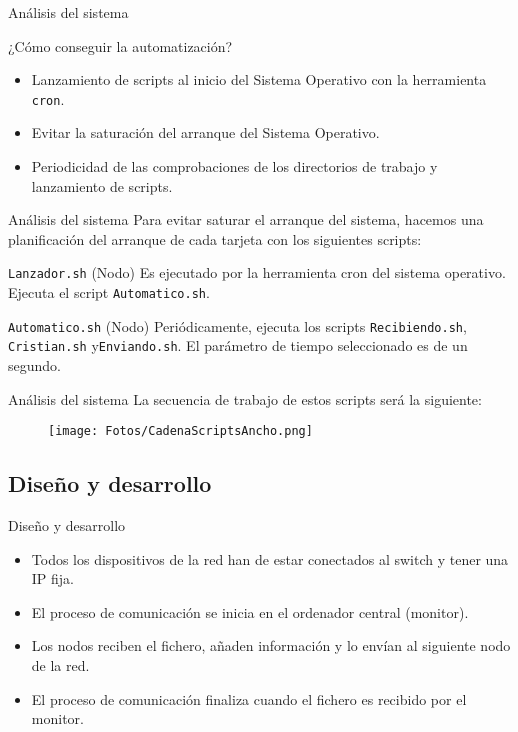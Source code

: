 \documentclass[aspectratio=169]{beamer}
\begin{document}
\begin{frame}{Análisis del sistema}
	\begin{block}{¿Cómo conseguir la automatización?}
		\begin{itemize}
			\item Lanzamiento de scripts al inicio del Sistema Operativo con la herramienta \texttt{cron}.
			\item Evitar la saturación del arranque del Sistema Operativo.
			\item Periodicidad de las comprobaciones de los directorios de trabajo y lanzamiento de scripts.
		\end{itemize}
	\end{block}
\end{frame}

\begin{frame}{Análisis del sistema}
Para evitar saturar el arranque del sistema, hacemos una planificación del arranque de cada tarjeta con los siguientes scripts:
	\begin{block}{\texttt{Lanzador.sh} (Nodo)}
		Es ejecutado por la herramienta cron del sistema operativo.
		Ejecuta el script \texttt{Automatico.sh}.
	\end{block}
	\begin{block}{\texttt{Automatico.sh} (Nodo)}
		Periódicamente, ejecuta los scripts \texttt{Recibiendo.sh}, \texttt{Cristian.sh} y\texttt{Enviando.sh}.
		El parámetro de tiempo seleccionado es de un segundo. %
	\end{block}
\end{frame}

\begin{frame}{Análisis del sistema}
	La secuencia de trabajo de estos scripts será la siguiente:
	\begin{figure}[h]
		\centering
		\texttt{[image: Fotos/CadenaScriptsAncho.png]}
	\end{figure}
\end{frame}

\subsection{Diseño y desarrollo}
\begin{frame}{Diseño y desarrollo}
\begin{itemize}
	\item Todos los dispositivos de la red han de estar conectados al switch y tener una IP fija.
	\item El proceso de comunicación se inicia en el ordenador central (monitor).
	\item Los nodos reciben el fichero, añaden información y lo envían al siguiente nodo de la red.
	\item El proceso de comunicación finaliza cuando el fichero es recibido por el monitor.
\end{itemize}
\end{frame}
\end{document}

